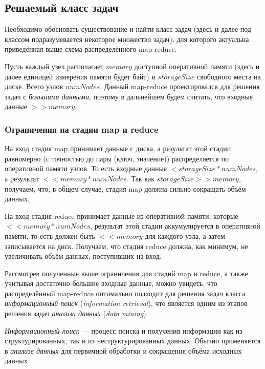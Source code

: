 \documentclass[12pt,a4paper,oneside]{extarticle}
\begin{document}
    \subsection{Решаемый класс задач}
    \label{sec:tasks}
        Необходимо обосновать существование и найти класс задач (здесь и далее под классом подразумевается некоторое множество задач), для которого актуальна приведённая выше схема распределённого map-reduce.

        Пусть каждый узел располагает $memory$ доступной оперативной памяти (здесь и далее единицей измерения памяти будет байт) и $storageSize$ свободного места на диске. Всего узлов $numNodes$. Данный map-reduce проектировался для решения задач с {\it большими данными}, поэтому в дальнейшем будем считать, что входные данные $>>memory$. 

        \subsubsection{Oграничения на стадии map и reduce}
            На вход стадия map принимает данные с диска, а результат этой стадии равномерно (с точностью до пары (ключ, значение)) распределяется по оперативной памяти узлов. То есть входные данные $<storageSize*numNodes$, а результат $<< memory*numNodes$. Так как $storageSize >> memory$, получаем, что, в общем случае, стадия map должна сильно сокращать объём данных.

            На вход стадия reduce принимает данные из оперативной памяти, которые $<< memory*numNodes$, результат этой стадии аккумулируется в оперативной памяти, то есть должен быть $<<memory$ для каждого узла, а затем записывается на диск. Получаем, что стадия reduce должна, как минимум, не увеличивать объём данных, поступивших на вход.

            Рассмотрев полученные выше ограничения для стадий map и reduce, а также учитывая достаточно большие входные данные, можно увидеть, что распределённый map-reduce оптимально подходит для решения задач класса {\it информационный поиск} ({\it information retrieval}), что является одним из этапов решения задач {\it анализа данных} ({\it data mining}).

            {\it Информационный поиск} --- процесс поиска и получения информации как из структурированных, так и из неструктурированных данных. Обычно применяется в {\it анализе данных} для первичной обработки и сокращения объёма исходных данных~\cite{mr_tasks}. 
\end{document}
